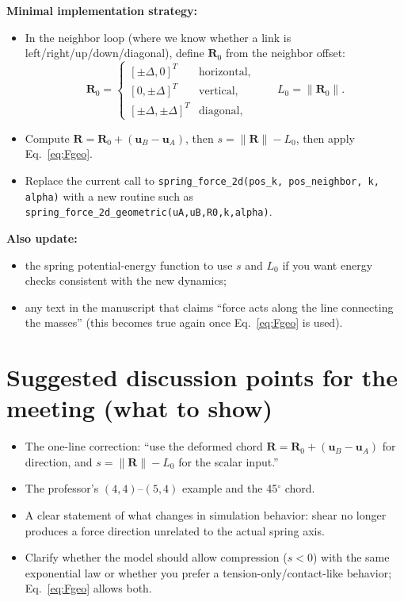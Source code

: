 \documentclass[11pt,a4paper]{article}
\begin{document}
\textbf{Minimal implementation strategy:}
\begin{itemize}
  \item In the neighbor loop (where we know whether a link is left/right/up/down/diagonal), define $\mathbf{R}_0$ from the neighbor offset:
  \[
  \mathbf{R}_0 =
  \begin{cases}
  [\pm\Delta,0]^T & \text{horizontal},\\
  [0,\pm\Delta]^T & \text{vertical},\\
  [\pm\Delta,\pm\Delta]^T & \text{diagonal},
  \end{cases}
  \qquad L_0=\|\mathbf{R}_0\|.
  \]
  \item Compute $\mathbf{R}=\mathbf{R}_0+(\mathbf{u}_B-\mathbf{u}_A)$, then $s=\|\mathbf{R}\|-L_0$, then apply Eq.~\eqref{eq:Fgeo}.
  \item Replace the current call to \texttt{spring\_force\_2d(pos\_k, pos\_neighbor, k, alpha)} with a new routine such as \texttt{spring\_force\_2d\_geometric(uA,uB,R0,k,alpha)}.
\end{itemize}

\textbf{Also update:}
\begin{itemize}
  \item the spring potential-energy function to use $s$ and $L_0$ if you want energy checks consistent with the new dynamics;
  \item any text in the manuscript that claims ``force acts along the line connecting the masses'' (this becomes true again once Eq.~\eqref{eq:Fgeo} is used).
\end{itemize}

\section{Suggested discussion points for the meeting (what to show)}
\begin{itemize}
  \item The one-line correction: ``use the deformed chord $\mathbf{R}=\mathbf{R}_0+(\mathbf{u}_B-\mathbf{u}_A)$ for direction, and $s=\|\mathbf{R}\|-L_0$ for the scalar input.''
  \item The professor's $(4,4)$--$(5,4)$ example and the 45$^\circ$ chord.
  \item A clear statement of what changes in simulation behavior: shear no longer produces a force direction unrelated to the actual spring axis.
  \item Clarify whether the model should allow compression ($s<0$) with the same exponential law or whether you prefer a tension-only/contact-like behavior; Eq.~\eqref{eq:Fgeo} allows both.
\end{itemize}
\end{document}

